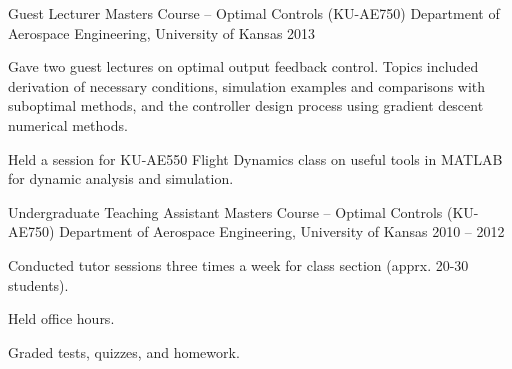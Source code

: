 \begin{cventries}
\cvprojwideentry
  	{Guest Lecturer} %
  	{Masters Course -- Optimal Controls (KU-AE750)} %
    {Department of Aerospace Engineering, University of Kansas} %
    {2013} %
    {
      \begin{cvitems} %
        \item Gave two guest lectures on optimal output feedback control. Topics included derivation of necessary conditions, simulation examples and comparisons with suboptimal methods, and the controller design process using gradient descent numerical methods.
		\item Held a session for KU-AE550 Flight Dynamics class on useful tools in MATLAB for dynamic analysis and simulation.
      \end{cvitems}
    } %
    {} %
    {\showprojectdescriptions}

\cvprojwideentry
  	{Undergraduate Teaching Assistant} %
  	{Masters Course -- Optimal Controls (KU-AE750)} %
    {Department of Aerospace Engineering, University of Kansas} %
    {2010 – 2012} %
    {
      \begin{cvitems} %
        \item Conducted tutor sessions three times a week for class section (apprx. 20-30 students).
		\item Held office hours.
		\item Graded tests, quizzes, and homework.
      \end{cvitems}
    } %
    {} %
    {\showprojectdescriptions}
\vspace*{-9pt}

\end{cventries}
